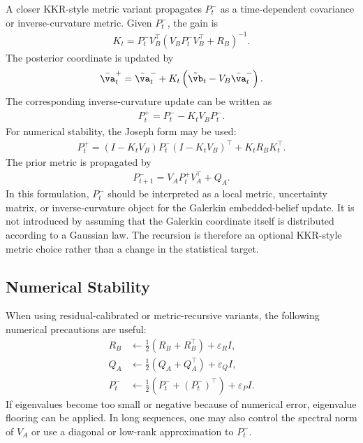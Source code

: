 \documentclass[twoside,11pt]{article}
\begin{document}
A closer KKR-style metric variant propagates $P_t^-$ as a
time-dependent covariance or inverse-curvature metric. Given $P_t^-$,
the gain is
\begin{align}
K_t
=
P_t^-V_B^\top
\left(
V_BP_t^-V_B^\top+R_B
\right)^{-1}.
\label{eq:app_metric_recursive_gain}
\end{align}
The posterior coordinate is updated by
\begin{align}
\bar{\va}_t^+
=
\bar{\va}_t^-
+
K_t
\left(
\tilde{\vb}_t - V_B\bar{\va}_t^-
\right).
\label{eq:app_metric_recursive_coordinate_update}
\end{align}
The corresponding inverse-curvature update can be written as
\begin{align}
P_t^+
=
P_t^-
-
K_tV_BP_t^-.
\label{eq:app_metric_recursive_simple_update}
\end{align}
For numerical stability, the Joseph form may be used:
\begin{align}
P_t^+
=
(I-K_tV_B)P_t^-(I-K_tV_B)^\top
+
K_tR_BK_t^\top.
\label{eq:app_metric_recursive_joseph}
\end{align}
The prior metric is propagated by
\begin{align}
P_{t+1}^-
=
V_AP_t^+V_A^\top
+
Q_A.
\label{eq:app_metric_recursive_prediction}
\end{align}
In this formulation, $P_t^-$ should be interpreted as a local metric,
uncertainty matrix, or inverse-curvature object for the Galerkin
embedded-belief update. It is not introduced by assuming that the
Galerkin coordinate itself is distributed according to a Gaussian law.
The recursion is therefore an optional KKR-style metric choice rather
than a change in the statistical target.

\subsection{Numerical Stability}

When using residual-calibrated or metric-recursive variants, the
following numerical precautions are useful:
\begin{align}
R_B
&\leftarrow
\frac12(R_B+R_B^\top)
+
\varepsilon_R I,
\\
Q_A
&\leftarrow
\frac12(Q_A+Q_A^\top)
+
\varepsilon_Q I,
\\
P_t^-
&\leftarrow
\frac12(P_t^-+(P_t^-)^\top)
+
\varepsilon_P I.
\end{align}
If eigenvalues become too small or negative because of numerical error,
eigenvalue flooring can be applied. In long sequences, one may also
control the spectral norm of $V_A$ or use a diagonal or low-rank
approximation to $P_t^-$.
\end{document}
